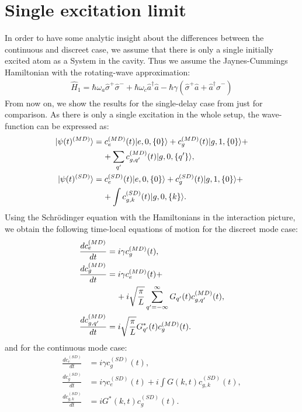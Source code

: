 \documentclass[%
 reprint,
 amsmath,amssymb,
pra,
]{revtex4-1}
\def\qp{{q^\prime}}
\def\ket#1{|#1\rangle}
\def\aop{\hat{a}}
\def\adop{\hat{a}^\dagger}
\def\sigop{\hat{\sigma}^-}
\def\sigdop{\hat{\sigma}^+}
\def\Hop{\hat{H}}
\def\qp{{q^\prime}}
\def\nn{\nonumber}
\newcommand{\lk}{\left(}
\newcommand{\rk}{\right)}
\begin{document}
\section{Single excitation limit}
In order to have some analytic insight about the differences between the continuous and discreet case, we assume that there is only a single initially excited atom as a System in the cavity. Thus we assume the Jaynes-Cummings Hamiltonian with the rotating-wave approximation:
\begin{align}
    \Hop_1 = \hbar\omega_a\sigdop\sigop + \hbar\omega_c\adop\aop - \hbar\gamma\lk\sigdop\aop+\adop\sigop\rk
\end{align}
From now on, we show the results for the single-delay case from \cite{Kabuss2015} just for comparison. As there is only a single excitation in the whole setup, the wave-function can be expressed as:
\begin{align}
\ket{\psi(t)^{(MD)}} &= c_e^{(MD)}(t)\ket{e,0,\{0\}} + c_g^{(MD)}(t)\ket{g,1,\{0\}} + \nn\\
&\hspace{.4cm}+\sum_\qp c_{g,\qp}^{(MD)}(t)\ket{g,0,\{\qp\}},\\
\ket{\psi(t)^{(SD)}} &= c_e^{(SD)}(t)\ket{e,0,\{0\}} + c_g^{(SD)}(t)\ket{g,1,\{0\}} + \nn\\
&\hspace{.4cm}+\int c_{g,k}^{(SD)}(t)\ket{g,0,\{k\}}.
\end{align}
Using the Schr\"odinger equation with the Hamiltonians in the interaction picture, we obtain the following time-local equations of motion for the discreet mode case:
\begin{align}
\label{eq:c_e_eq_MD}
\frac{dc_e^{(MD)}}{dt} &= i\gamma c_g^{(MD)}(t),\\
\label{eq:c_g_eq_MD}
\frac{dc_g^{(MD)}}{dt} &= i\gamma c_e^{(MD)}(t) +\nn\\ &\hspace{.4cm}+i\sqrt{\frac{\pi}{L}}\sum_{\qp=-\infty}^{\infty}G_\qp(t)c_{g,\qp}^{(MD)}(t),\\
\label{eq:c_gqp_eq_MD}
\frac{dc_{g,\qp}^{(MD)}}{dt} &= i\sqrt{\frac{\pi}{L}}G^*_\qp(t)c_g^{(MD)}(t).
\end{align}
and for the continuous mode case:
\begin{align}
\label{eq:c_e_eq_SD}
\frac{dc_e^{(SD)}}{dt} &= i\gamma c_g^{(SD)}(t),\\
\label{eq:c_g_eq_SD}
\frac{dc^{(SD)}_g}{dt} &= i\gamma c^{(SD)}_e(t) + i\int G(k,t)c^{(SD)}_{g,k}(t),\\
\label{eq:c_gqp_eq_SD}
\frac{dc^{(SD)}_{g,k}}{dt} &= iG^*(k,t)c^{(SD)}_g(t).
\end{align}
\end{document}
